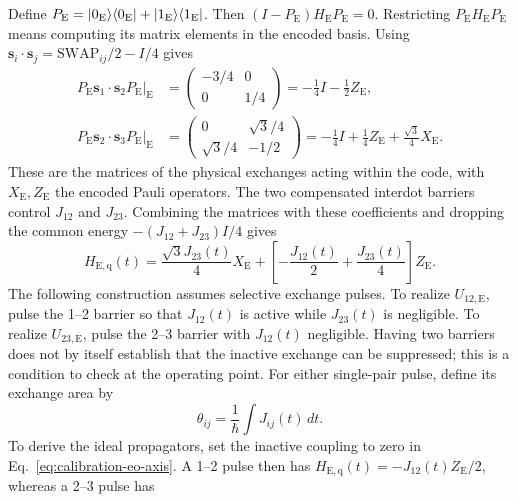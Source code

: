 Define $P_{\mathrm E}=\lvert 0_{\mathrm E}\rangle\langle 0_{\mathrm E}\rvert
+\lvert 1_{\mathrm E}\rangle\langle 1_{\mathrm E}\rvert$.
Then $(I-P_{\mathrm E})H_{\mathrm E}P_{\mathrm E}=0$.
Restricting $P_{\mathrm E}H_{\mathrm E}P_{\mathrm E}$ means computing
its matrix elements in the encoded basis. Using
$\mathbf{s}_i\cdot\mathbf{s}_j=\mathrm{SWAP}_{ij}/2-I/4$ gives
\begin{equation}
 \begin{aligned}
 \left.P_{\mathrm E}\mathbf{s}_1\cdot\mathbf{s}_2P_{\mathrm E}
       \right|_{\mathrm E}
   &=\begin{pmatrix}-3/4&0\\0&1/4\end{pmatrix}
     =-\frac14 I-\frac12 Z_{\mathrm E},\\
 \left.P_{\mathrm E}\mathbf{s}_2\cdot\mathbf{s}_3P_{\mathrm E}
       \right|_{\mathrm E}
   &=\begin{pmatrix}0&\sqrt3/4\\\sqrt3/4&-1/2\end{pmatrix}
     =-\frac14 I+\frac14 Z_{\mathrm E}
                       +\frac{\sqrt3}{4}X_{\mathrm E}.
 \end{aligned}
 \label{eq:exchange-only-projection}
\end{equation}
These are the matrices of the physical exchanges acting within the
code, with $X_{\mathrm E},Z_{\mathrm E}$ the encoded Pauli operators.
The two compensated interdot barriers control $J_{12}$ and $J_{23}$.
Combining the matrices with these coefficients and dropping the
common energy $-(J_{12}+J_{23})I/4$ gives
\begin{equation}
 H_{\mathrm{E,q}}(t)
 =\frac{\sqrt3J_{23}(t)}4 X_{\mathrm E}
  +\left[-\frac{J_{12}(t)}2+\frac{J_{23}(t)}4\right]Z_{\mathrm E}.
 \label{eq:calibration-eo-axis}
\end{equation}
The following construction assumes selective exchange pulses.
To realize $U_{12,\mathrm E}$, pulse the 1--2 barrier so that
$J_{12}(t)$ is active while $J_{23}(t)$ is negligible. To realize
$U_{23,\mathrm E}$, pulse the 2--3 barrier with $J_{12}(t)$
negligible. Having two barriers does not by itself establish that
the inactive exchange can be suppressed; this is a condition to
check at the operating point. For either single-pair pulse, define
its exchange area by
\[
 \theta_{ij}=\frac1\hbar\int J_{ij}(t)\,dt.
\]
To derive the ideal propagators, set the inactive coupling to
zero in Eq.~\eqref{eq:calibration-eo-axis}. A 1--2 pulse then has
$H_{\mathrm{E,q}}(t)=-J_{12}(t)Z_{\mathrm E}/2$, whereas a 2--3
pulse has
